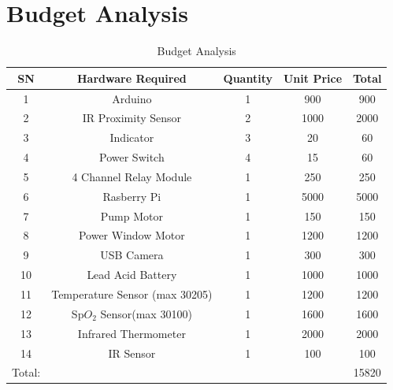\documentclass[a4paper,12pt]{report}
\begin{document}
\section{Budget Analysis}
\begin{table}[h]%
\centering
\begin{tabular}{|c|c|c|c|c|}
	
	\hline
	\textbf{SN} & \textbf{Hardware Required} & \textbf{Quantity} & \textbf{Unit Price} &\textbf{ Total}\\
	\hline
	1 & Arduino & 1 & 900 & 900 \\
	\hline
	2 & IR Proximity Sensor & 2 & 1000 & 2000\\
	\hline
	3 & Indicator & 3 & 20 & 60\\
	\hline
	4 & Power Switch  & 4 & 15 & 60\\
	\hline
	5 & 4 Channel Relay Module & 1 & 250 & 250 \\
  \hline
  6 & Rasberry Pi & 1 & 5000 & 5000 \\
  \hline
  7 & Pump Motor & 1 & 150 & 150 \\
  \hline
  8 & Power Window Motor & 1 & 1200 & 1200 \\
  \hline
  9 & USB Camera & 1 & 300 & 300 \\
  \hline
  10 & Lead Acid Battery & 1 & 1000 & 1000 \\
  \hline
   11 & Temperature Sensor (max 30205) & 1 & 1200 & 1200\\
\hline
   12 & Sp$O_2$ Sensor(max  30100) & 1 & 1600 & 1600\\
\hline
   13 & Infrared Thermometer & 1 & 2000 & 2000\\
\hline
 14 & IR Sensor & 1 & 100 & 100 \\
  \hline
Total: &  &  &  & 15820 \\
\hline
\end{tabular}
\caption{Budget Analysis }
\label{aaa}

\end{table}
\end{document}
